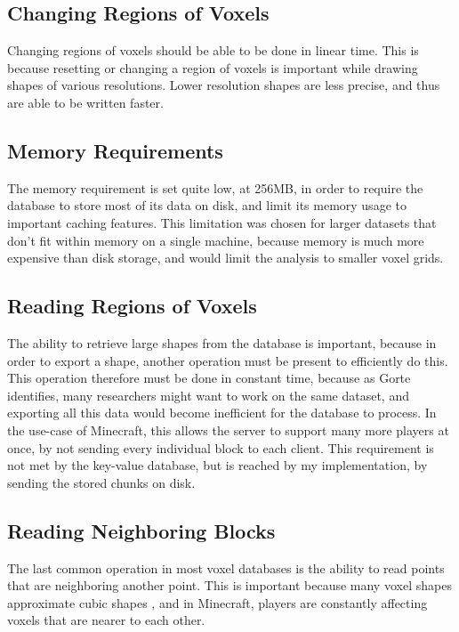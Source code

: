 \documentclass[10pt,twocolumn]{article}
\begin{document}
\subsection{Changing Regions of Voxels}

Changing regions of voxels should be able to be done in linear time. This is
because resetting or changing a region of voxels is important while drawing
shapes of various resolutions. Lower resolution shapes are less precise, and
thus are able to be written faster.

\subsection{Memory Requirements}

The memory requirement is set quite low, at 256MB, in order to require the
database to store most of its data on disk, and limit its memory usage to
important caching features. This limitation was chosen for larger datasets that
don't fit within memory on a single machine, because memory is much more
expensive than disk storage, and would limit the analysis to smaller voxel grids.

\subsection{Reading Regions of Voxels}

The ability to retrieve large shapes from the database is important, because in
order to export a shape, another operation must be present to efficiently do
this. This operation therefore must be done in constant time, because as
Gorte\cite{gorte2023analysis} identifies, many researchers might want to work
on the same dataset, and exporting all this data would become inefficient for
the database to process. In the use-case of Minecraft, this allows the server to
support many more players at once, by not sending every individual block to each
client. This requirement is not met by the key-value database, but is reached by
my implementation, by sending the stored chunks on disk.

\subsection{Reading Neighboring Blocks}

The last common operation in most voxel databases is the ability to read points
that are neighboring another point. This is important because many voxel shapes
approximate cubic shapes \cite{gorte2023analysis}, and in Minecraft, players are
constantly affecting voxels that are nearer to each other.
\end{document}

